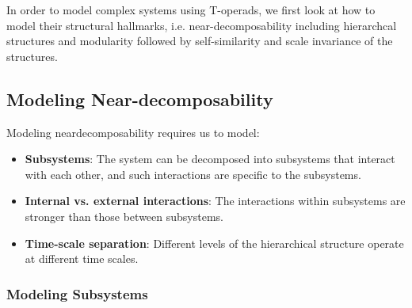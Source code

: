In order to model complex systems using T-operads, we first look at how to model their structural hallmarks, i.e. near-decomposability including hierarchcal structures and modularity followed by self-similarity and scale invariance of the structures.

\subsection{Modeling Near-decomposability}

Modeling neardecomposability requires us to model:

\begin{itemize}
    \item \textbf{Subsystems}: The system can be decomposed into subsystems that interact with each other, and such interactions are specific to the subsystems.
    \item \textbf{Internal vs. external interactions}: The interactions within subsystems are stronger than those between subsystems.
    \item \textbf{Time-scale separation}: Different levels of the hierarchical structure operate at different time scales.
\end{itemize}

\subsubsection{Modeling Subsystems}
